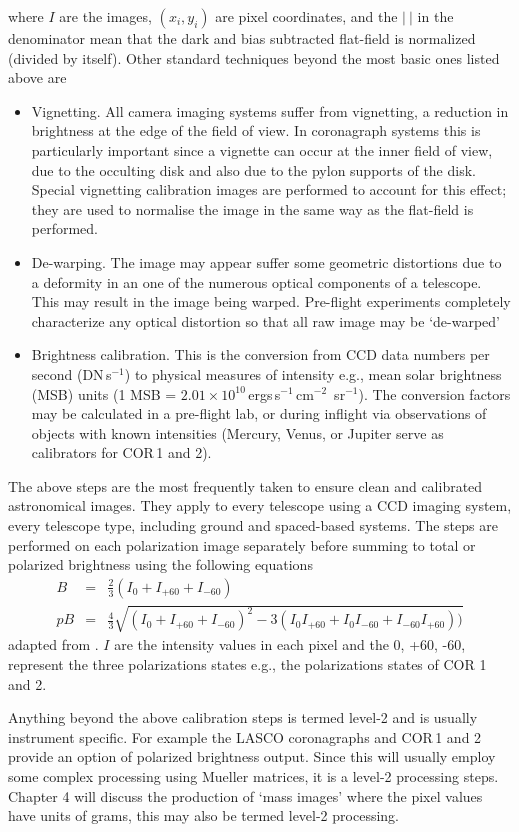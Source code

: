 where $I$ are the images, $(x_i, y_i)$ are pixel coordinates, and the $|~|$ in the denominator mean that the dark and bias subtracted flat-field is normalized (divided by itself). Other standard techniques beyond the most basic ones listed above are
\begin{itemize}
\item Vignetting. All camera imaging systems suffer from vignetting, a reduction in brightness at the edge of the field of view. In coronagraph systems this is particularly important since a vignette can occur at the inner field of view, due to the occulting disk and also due to the pylon supports of the disk. Special vignetting calibration images are performed to account for this effect; they are used to normalise the image in the same way as the flat-field is performed.
\item De-warping. The image may appear suffer some geometric distortions due to a deformity in an one of the numerous optical components of a telescope. This may result in the image being warped. Pre-flight experiments completely characterize any optical distortion so that all raw image may be `de-warped'
\item Brightness calibration. This is the conversion from CCD data numbers per second (DN\,s$^{-1}$) to physical measures of intensity e.g., mean solar brightness (MSB) units (1 MSB = $2.01\times10^{10}$\,ergs\,s$^{-1}$\,cm$^{-2}$\, sr$^{-1}$). The conversion factors may be calculated in a pre-flight lab, or during inflight via observations of objects with known intensities (Mercury, Venus, or Jupiter serve as calibrators for COR\,1 and 2).
\end{itemize}
The above steps are the most frequently taken to ensure clean and calibrated astronomical images. They apply to every telescope using a CCD imaging system, every telescope type, including ground and spaced-based systems. The steps are performed on each polarization image separately before summing to total or polarized brightness using the following equations
\begin{eqnarray}
B &=& \frac{2}{3}(I_0 + I_{+60} + I_{-60}) \\
pB &=& \frac{4}{3}\sqrt{(I_0 + I_{+60} + I_{-60})^2 - 3(I_0I_{+60} + I_0I_{-60} + I_{-60}I_{+60}) )}
\end{eqnarray}
adapted from \citet{billings1966}. $I$ are the intensity values in each pixel and the 0, +60, -60, represent the three polarizations states e.g., the polarizations states of COR 1 and 2.

Anything beyond the above calibration steps is termed level-2 and is usually instrument specific. For example the LASCO coronagraphs and COR\,1 and 2 provide an option of polarized brightness output. Since this will usually employ some complex processing using Mueller matrices, it is a level-2 processing steps. Chapter 4 will discuss the production of `mass images' where the pixel values have units of grams, this may also be termed level-2 processing.


